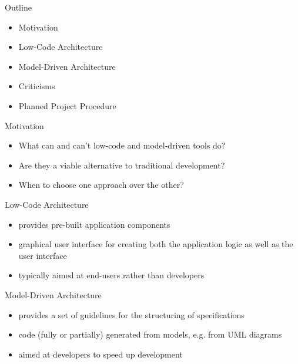 \documentclass[aspectratio=169]{beamer}
\date{\formatdate{20}{10}{2020}}
\institute{supervised by Prof. Dr. Ruth Breu}
\begin{document}
  \maketitle

  \begin{frame}{Outline}
    \begin{itemize}
      \item Motivation
      \item Low-Code Architecture
      \item Model-Driven Architecture
      \item Criticisms
      \item Planned Project Procedure
    \end{itemize}
  \end{frame}

  \begin{frame}{Motivation}
    \begin{itemize}
      \item What can and can't low-code and model-driven tools do?
      \item Are they a viable alternative to traditional development?
      \item When to choose one approach over the other?
    \end{itemize}
  \end{frame}

  \begin{frame}{Low-Code Architecture}
    \begin{itemize}
      \item provides pre-built application components
      \item graphical user interface for creating both the
            application logic as well as the user interface
      \item typically aimed at end-users rather than developers
    \end{itemize}
  \end{frame}

  \begin{frame}{Model-Driven Architecture}
    \begin{itemize}
      \item provides a set of guidelines for the structuring of specifications
      \item code (fully or partially) generated from models, e.g. from UML diagrams
      \item aimed at developers to speed up development
    \end{itemize}
  \end{frame}
\end{document}
